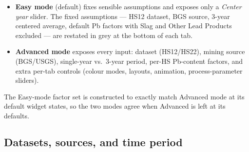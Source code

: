 \documentclass[11pt,a4paper]{article}
\begin{document}
\begin{itemize}[leftmargin=1.4em]
  \item \textbf{Easy mode} (default) fixes sensible assumptions and exposes only a
        \emph{Center year} slider. The fixed assumptions --- HS12 dataset, BGS
        source, 3-year centered average, default Pb factors with Slag and Other
        Lead Products excluded --- are restated in grey at the bottom of each tab.
  \item \textbf{Advanced mode} exposes every input: dataset (HS12/HS22), mining
        source (BGS/USGS), single-year vs.\ 3-year period, per-HS Pb-content
        factors, and extra per-tab controls (colour modes, layouts, animation,
        process-parameter sliders).
\end{itemize}

The Easy-mode factor set is constructed to exactly match Advanced mode at its
default widget states, so the two modes agree when Advanced is left at its
defaults.

\subsection{Datasets, sources, and time period}
\end{document}
